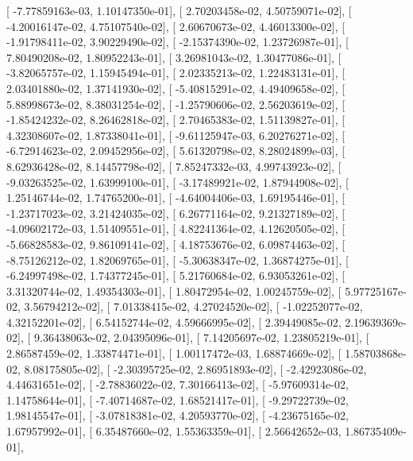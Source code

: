 \documentclass{article}
\begin{document}
       [ -7.77859163e-03,   1.10147350e-01],
       [  2.70203458e-02,   4.50759071e-02],
       [ -4.20016147e-02,   4.75107540e-02],
       [  2.60670673e-02,   4.46013300e-02],
       [ -1.91798411e-02,   3.90229490e-02],
       [ -2.15374390e-02,   1.23726987e-01],
       [  7.80490208e-02,   1.80952243e-01],
       [  3.26981043e-02,   1.30477086e-01],
       [ -3.82065757e-02,   1.15945494e-01],
       [  2.02335213e-02,   1.22483131e-01],
       [  2.03401880e-02,   1.37141930e-02],
       [ -5.40815291e-02,   4.49409658e-02],
       [  5.88998673e-02,   8.38031254e-02],
       [ -1.25790606e-02,   2.56203619e-02],
       [ -1.85424232e-02,   8.26462818e-02],
       [  2.70465383e-02,   1.51139827e-01],
       [  4.32308607e-02,   1.87338041e-01],
       [ -9.61125947e-03,   6.20276271e-02],
       [ -6.72914623e-02,   2.09452956e-02],
       [  5.61320798e-02,   8.28024899e-03],
       [  8.62936428e-02,   8.14457798e-02],
       [  7.85247332e-03,   4.99743923e-02],
       [ -9.03263525e-02,   1.63999100e-01],
       [ -3.17489921e-02,   1.87944908e-02],
       [  1.25146744e-02,   1.74765200e-01],
       [ -4.64004406e-03,   1.69195446e-01],
       [ -1.23717023e-02,   3.21424035e-02],
       [  6.26771164e-02,   9.21327189e-02],
       [ -4.09602172e-03,   1.51409551e-01],
       [  4.82241364e-02,   4.12620505e-02],
       [ -5.66828583e-02,   9.86109141e-02],
       [  4.18753676e-02,   6.09874463e-02],
       [ -8.75126212e-02,   1.82069765e-01],
       [ -5.30638347e-02,   1.36874275e-01],
       [ -6.24997498e-02,   1.74377245e-01],
       [  5.21760684e-02,   6.93053261e-02],
       [  3.31320744e-02,   1.49354303e-01],
       [  1.80472954e-02,   1.00245759e-02],
       [  5.97725167e-02,   3.56794212e-02],
       [  7.01338415e-02,   4.27024520e-02],
       [ -1.02252077e-02,   4.32152201e-02],
       [  6.54152744e-02,   4.59666995e-02],
       [  2.39449085e-02,   2.19639369e-02],
       [  9.36438063e-02,   2.04395096e-01],
       [  7.14205697e-02,   1.23805219e-01],
       [  2.86587459e-02,   1.33874471e-01],
       [  1.00117472e-03,   1.68874669e-02],
       [  1.58703868e-02,   8.08175805e-02],
       [ -2.30395725e-02,   2.86951893e-02],
       [ -2.42923086e-02,   4.44631651e-02],
       [ -2.78836022e-02,   7.30166413e-02],
       [ -5.97609314e-02,   1.14758644e-01],
       [ -7.40714687e-02,   1.68521417e-01],
       [ -9.29722739e-02,   1.98145547e-01],
       [ -3.07818381e-02,   4.20593770e-02],
       [ -4.23675165e-02,   1.67957992e-01],
       [  6.35487660e-02,   1.55363359e-01],
       [  2.56642652e-03,   1.86735409e-01],
\end{document}
